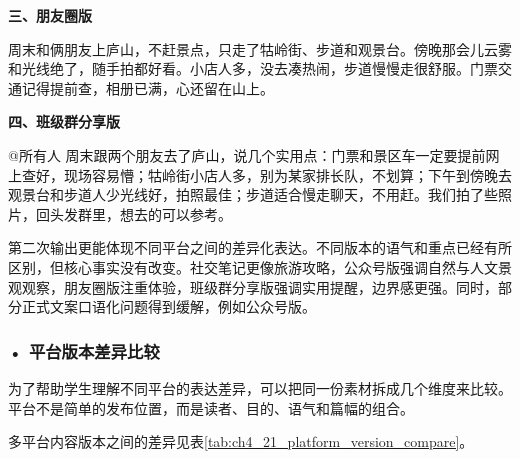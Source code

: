\begin{aibox}
\textbf{三、朋友圈版}

\par\qquad 周末和俩朋友上庐山，不赶景点，只走了牯岭街、步道和观景台。傍晚那会儿云雾和光线绝了，随手拍都好看。小店人多，没去凑热闹，步道慢慢走很舒服。门票交通记得提前查，相册已满，心还留在山上。

\textbf{四、班级群分享版}

\par\qquad @所有人 周末跟两个朋友去了庐山，说几个实用点：门票和景区车一定要提前网上查好，现场容易懵；牯岭街小店人多，别为某家排长队，不划算；下午到傍晚去观景台和步道人少光线好，拍照最佳；步道适合慢走聊天，不用赶。我们拍了些照片，回头发群里，想去的可以参考。
\end{aibox}

第二次输出更能体现不同平台之间的差异化表达。不同版本的语气和重点已经有所区别，但核心事实没有改变。社交笔记更像旅游攻略，公众号版强调自然与人文景观观察，朋友圈版注重体验，班级群分享版强调实用提醒，边界感更强。同时，部分正式文案口语化问题得到缓解，例如公众号版。

\subsubsection*{\textbf{• 平台版本差异比较}}

为了帮助学生理解不同平台的表达差异，可以把同一份素材拆成几个维度来比较。平台不是简单的发布位置，而是读者、目的、语气和篇幅的组合。


多平台内容版本之间的差异见表\ref{tab:ch4_21_platform_version_compare}。

